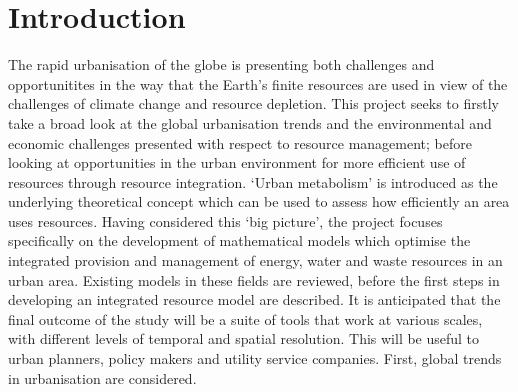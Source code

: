 \section{Introduction}
The rapid urbanisation of the globe is presenting both challenges and opportunitites in the way that the Earth's finite resources are used in view of the challenges of climate change and resource depletion. This project seeks to firstly take a broad look at the global urbanisation trends and the environmental and economic challenges presented with respect to resource management; before looking at opportunities in the urban environment for more efficient use of resources through resource integration. `Urban metabolism' is introduced as the underlying theoretical concept which can be used to assess how efficiently an area uses resources. Having considered this `big picture', the project focuses specifically on the development of mathematical models which optimise the integrated provision and management of energy, water and waste resources in an urban area. Existing models in these fields are reviewed, before the first steps in developing an integrated resource model are described. It is anticipated that the final outcome of the study will be a suite of tools that work at various scales, with different levels of temporal and spatial resolution. This will be useful to urban planners, policy makers and utility service companies. First, global trends in urbanisation are considered.

